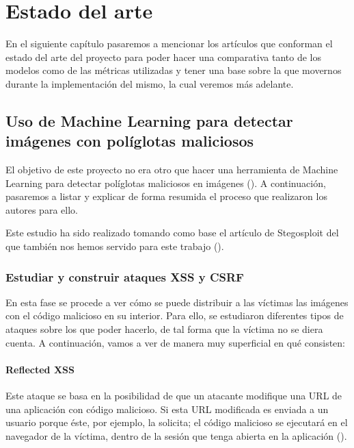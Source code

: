 \chapter{Estado del arte}
\label{ch:sota}

En el siguiente capítulo pasaremos a mencionar los artículos que conforman el estado del arte del proyecto para poder hacer una comparativa tanto de los modelos como de las métricas utilizadas y tener una base sobre la que movernos durante la implementación del mismo, la cual veremos más adelante.

\section{Uso de Machine Learning para detectar imágenes con políglotas maliciosos}

El objetivo de este proyecto no era otro que hacer una herramienta de Machine Learning para detectar políglotas maliciosos en imágenes (\cite{ml-stenography-shawat}). A continuación, pasaremos a listar y explicar de forma resumida el proceso que realizaron los autores para ello. %

Este estudio ha sido realizado tomando como base el artículo de Stegosploit del que también nos hemos servido para este trabajo (\cite{stegosploit}). %

\subsection{Estudiar y construir ataques XSS y CSRF}

En esta fase se procede a ver cómo se puede distribuir a las víctimas las imágenes con el código malicioso en su interior. Para ello, se estudiaron diferentes tipos de ataques sobre los que poder hacerlo, de tal forma que la víctima no se diera cuenta. A continuación, vamos a ver de manera muy superficial en qué consisten:

\subsubsection{Reflected XSS}

Este ataque se basa en la posibilidad de que un atacante modifique una URL de una aplicación con código malicioso. Si esta URL modificada es enviada a un usuario porque éste, por ejemplo, la solicita; el código malicioso se ejecutará en el navegador de la víctima, dentro de la sesión que tenga abierta en la aplicación (\cite{reflected-xss}). %

